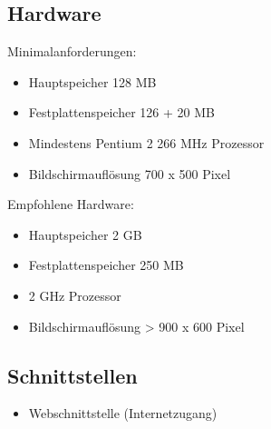 \subsection{Hardware}
	Minimalanforderungen:
   \begin{itemize}
      \item Hauptspeicher 128 MB
      \item Festplattenspeicher 126 + 20 MB
      \item Mindestens Pentium 2 266 MHz Prozessor
      \item Bildschirmauflösung 700 x 500 Pixel
   \end{itemize}
   Empfohlene Hardware:
   \begin{itemize}
         \item Hauptspeicher 2 GB
      \item Festplattenspeicher 250 MB
      \item 2 GHz Prozessor
      \item Bildschirmauflösung > 900 x 600 Pixel
   \end{itemize}
\subsection{Schnittstellen}
   \begin{itemize}
   \item Webschnittstelle (Internetzugang)
   \end{itemize}
